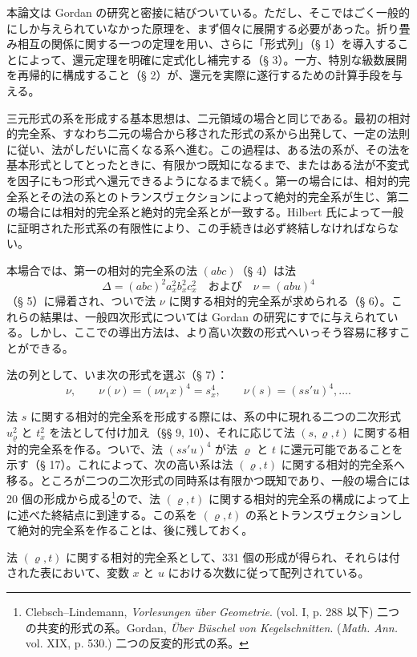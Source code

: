 \documentclass[11pt]{article}
\begin{document}
本論文は Gordan の研究と密接に結びついている。ただし、そこではごく一般的にしか与えられていなかった原理を、まず個々に展開する必要があった。折り畳み相互の関係に関する一つの定理を用い、さらに「形式列」（§ 1）を導入することによって、還元定理を明確に定式化し補完する（§ 3）。一方、特別な級数展開を再帰的に構成すること（§ 2）が、還元を実際に遂行するための計算手段を与える。

三元形式の系を形成する基本思想は、二元領域の場合と同じである。最初の相対的完全系、すなわち二元の場合から移された形式の系から出発して、一定の法則に従い、法がしだいに高くなる系へ進む。この過程は、ある法の系が、その法を基本形式としてとったときに、有限かつ既知になるまで、またはある法が不変式を因子にもつ形式へ還元できるようになるまで続く。第一の場合には、相対的完全系とその法の系とのトランスヴェクションによって絶対的完全系が生じ、第二の場合には相対的完全系と絶対的完全系とが一致する。Hilbert 氏によって一般に証明された形式系の有限性により、この手続きは必ず終結しなければならない。

本場合では、第一の相対的完全系の法 $(abc)$（§ 4）は法
\[
\Delta=(abc)^2a_x^2b_x^2c_x^2\quad\text{および}\quad \nu=(abu)^4
\]
（§ 5）に帰着され、ついで法 $\nu$ に関する相対的完全系が求められる（§ 6）。これらの結果は、一般四次形式については Gordan の研究にすでに与えられている。しかし、ここでの導出方法は、より高い次数の形式へいっそう容易に移すことができる。

法の列として、いま次の形式を選ぶ（§ 7）：
\[
\nu,\qquad \nu(\nu)=(\nu\nu_1x)^4=s_x^4,\qquad \nu(s)=(ss'u)^4,\ldots .
\]

法 $s$ に関する相対的完全系を形成する際には、系の中に現れる二つの二次形式 $u_\varrho^2$ と $t_x^2$ を法として付け加え（§§ 9, 10）、それに応じて法 $(s,\varrho,t)$ に関する相対的完全系を作る。ついで、法 $(ss'u)^4$ が法 $\varrho$ と $t$ に還元可能であることを示す（§ 17）。これによって、次の高い系は法 $(\varrho,t)$ に関する相対的完全系へ移る。ところが二つの二次形式の同時系は有限かつ既知であり、一般の場合には 20 個の形成から成る\footnote{Clebsch--Lindemann, \emph{Vorlesungen über Geometrie}. (vol. I, p. 288 以下) 二つの共変的形式の系。Gordan, \emph{Über Büschel von Kegelschnitten}. (\emph{Math. Ann.} vol. XIX, p. 530.) 二つの反変的形式の系。}ので、法 $(\varrho,t)$ に関する相対的完全系の構成によって上に述べた終結点に到達する。この系を $(\varrho,t)$ の系とトランスヴェクションして絶対的完全系を作ることは、後に残しておく。

法 $(\varrho,t)$ に関する相対的完全系として、331 個の形成が得られ、それらは付された表において、変数 $x$ と $u$ における次数に従って配列されている。
\end{document}
